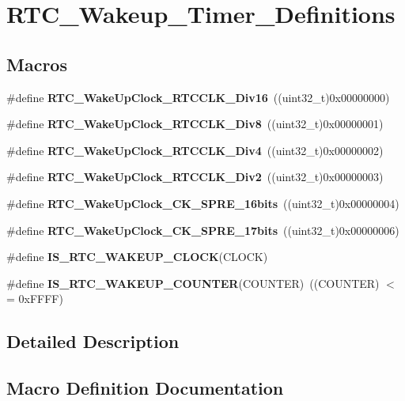 \section{R\+T\+C\+\_\+\+Wakeup\+\_\+\+Timer\+\_\+\+Definitions}
\label{group__RTC__Wakeup__Timer__Definitions}
\subsection*{Macros}
\begin{DoxyCompactItemize}
\item 
\#define \textbf{ R\+T\+C\+\_\+\+Wake\+Up\+Clock\+\_\+\+R\+T\+C\+C\+L\+K\+\_\+\+Div16}~((uint32\+\_\+t)0x00000000)
\item 
\#define \textbf{ R\+T\+C\+\_\+\+Wake\+Up\+Clock\+\_\+\+R\+T\+C\+C\+L\+K\+\_\+\+Div8}~((uint32\+\_\+t)0x00000001)
\item 
\#define \textbf{ R\+T\+C\+\_\+\+Wake\+Up\+Clock\+\_\+\+R\+T\+C\+C\+L\+K\+\_\+\+Div4}~((uint32\+\_\+t)0x00000002)
\item 
\#define \textbf{ R\+T\+C\+\_\+\+Wake\+Up\+Clock\+\_\+\+R\+T\+C\+C\+L\+K\+\_\+\+Div2}~((uint32\+\_\+t)0x00000003)
\item 
\#define \textbf{ R\+T\+C\+\_\+\+Wake\+Up\+Clock\+\_\+\+C\+K\+\_\+\+S\+P\+R\+E\+\_\+16bits}~((uint32\+\_\+t)0x00000004)
\item 
\#define \textbf{ R\+T\+C\+\_\+\+Wake\+Up\+Clock\+\_\+\+C\+K\+\_\+\+S\+P\+R\+E\+\_\+17bits}~((uint32\+\_\+t)0x00000006)
\item 
\#define \textbf{ I\+S\+\_\+\+R\+T\+C\+\_\+\+W\+A\+K\+E\+U\+P\+\_\+\+C\+L\+O\+CK}(C\+L\+O\+CK)
\item 
\#define \textbf{ I\+S\+\_\+\+R\+T\+C\+\_\+\+W\+A\+K\+E\+U\+P\+\_\+\+C\+O\+U\+N\+T\+ER}(C\+O\+U\+N\+T\+ER)~((C\+O\+U\+N\+T\+ER) $<$= 0x\+F\+F\+F\+F)
\end{DoxyCompactItemize}


\subsection{Detailed Description}


\subsection{Macro Definition Documentation}
\mbox{\label{group__RTC__Wakeup__Timer__Definitions_gab847ce0346dc26930a3b2c1da3ed9e28}} 

